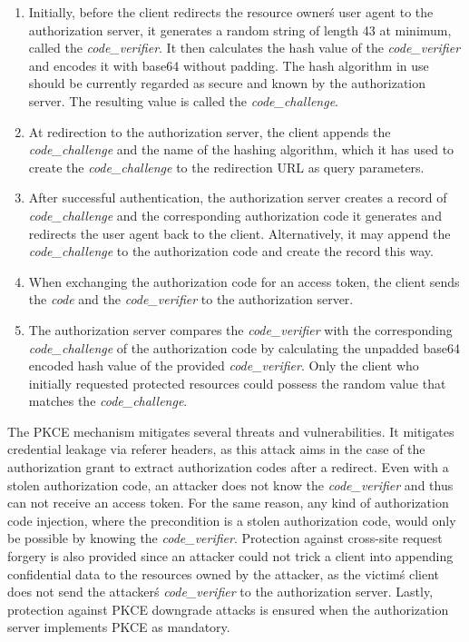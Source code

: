 \begin{enumerate}
	\item Initially, before the client redirects the resource owner\'s user agent to the authorization server, it generates a random string of length 43 at minimum, called the \emph{code\_verifier}. It then calculates the hash value of the \emph{code\_verifier} and encodes it with base64 without padding. The hash algorithm in use should be currently regarded as secure and known by the authorization server. The resulting value is called the \emph{code\_challenge}.
	
	\item At redirection to the authorization server, the client appends the \emph{code\_challenge} and the name of the hashing algorithm, which it has used to create the \emph{code\_challenge} to the redirection URL as query parameters.
	
	\item After successful authentication, the authorization server creates a record of \emph{code\_challenge} and the corresponding authorization code it generates and redirects the user agent back to the client. Alternatively, it may append the \emph{code\_challenge} to the authorization code and create the record this way.
	
	\item When exchanging the authorization code for an access token, the client sends the \emph{code} and the \emph{code\_verifier} to the authorization server.

	\item The authorization server compares the \emph{code\_verifier} with the corresponding \emph{code\_challenge} of the authorization code by calculating the unpadded base64 encoded hash value of the provided \emph{code\_verifier}. Only the client who initially requested protected resources could possess the random value that matches the \emph{code\_challenge}.
\end{enumerate}


The PKCE mechanism mitigates several threats and vulnerabilities. It mitigates credential leakage via referer headers, as this attack aims in the case of the authorization grant to extract authorization codes after a redirect. Even with a stolen authorization code, an attacker does not know the \emph{code\_verifier} and thus can not receive an access token. For the same reason, any kind of authorization code injection, where the precondition is a stolen authorization code, would only be possible by knowing the \emph{code\_verifier}. Protection against cross-site request forgery is also provided since an attacker could not trick a client into appending confidential data to the resources owned by the attacker, as the victim\'s client does not send the attacker\'s \emph{code\_verifier} to the authorization server. Lastly, protection against PKCE downgrade attacks is ensured when the authorization server implements PKCE as mandatory.

